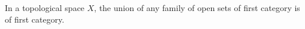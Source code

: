 In a topological space $X$, the union of any family of open sets of first category is of first category.
